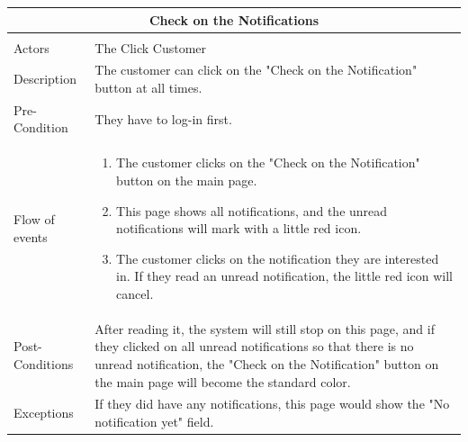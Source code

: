 \documentclass[a4paper,12pt]{report}
\begin{document}
\begin{center}
	\begin{tabular}{p{}|p{}}
		\multicolumn{2}{c}{\large \textbf{Check on the Notifications}} \\[3mm] 
		\hline \\
		Actors &  The Click Customer \\[3mm] 
		Description &  The customer can click on the "Check on the Notification" button at all times.  \\[3mm]  
		Pre-Condition &  They have to log-in first.\\[3mm] 
		Flow of events & 
		\begin{enumerate}
			\item The customer clicks on the "Check on the Notification" button on the main page.
			\item This page shows all notifications, and the unread notifications will mark with a little red icon.
			\item The customer clicks on the notification they are interested in. If they read an unread notification, the little red icon will cancel.
		\end{enumerate}
		\\[3mm] 
		Post-Conditions & After reading it, the system will still stop on this page, and if they clicked on all unread notifications so that there is no unread notification, the "Check on the Notification" button on the main page will become the standard color.\\[3mm] 
		Exceptions & If they did have any notifications,  this page would show the "No notification yet" field.  \\[3mm] 
	\end{tabular}
\end{center}
\end{document}
